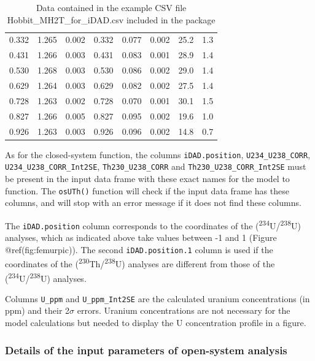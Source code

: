\documentclass[]{elsarticle} %
\begin{document}
\begin{table}[ht]
\begin{tabular}{cccccccc}
  0.332 & 1.265 & 0.002 & 0.332 & 0.077 & 0.002 & 25.2 & 1.3 \\ 
  0.431 & 1.266 & 0.003 & 0.431 & 0.083 & 0.001 & 28.9 & 1.4 \\ 
  0.530 & 1.268 & 0.003 & 0.530 & 0.086 & 0.002 & 29.0 & 1.4 \\ 
  0.629 & 1.264 & 0.003 & 0.629 & 0.082 & 0.002 & 27.5 & 1.4 \\ 
  0.728 & 1.263 & 0.002 & 0.728 & 0.070 & 0.001 & 30.1 & 1.5 \\ 
  0.827 & 1.266 & 0.005 & 0.827 & 0.095 & 0.002 & 19.6 & 1.0 \\ 
  0.926 & 1.263 & 0.003 & 0.926 & 0.096 & 0.002 & 14.8 & 0.7 \\ 
   \hline
\end{tabular}
\caption{\label{tab:hobbitone}Data contained in the example CSV file Hobbit\_MH2T\_for\_iDAD.csv included in the package} 
\end{table}

As for the closed-system function, the columns \texttt{iDAD.position}, \texttt{U234\_U238\_CORR}, \texttt{U234\_U238\_CORR\_Int2SE}, \texttt{Th230\_U238\_CORR} and \texttt{Th230\_U238\_CORR\_Int2SE} must be present in the input data frame with these exact names for the model to function. The \texttt{osUTh()} function will check if the input data frame has these columns, and will stop with an error message if it does not find these columns.

The \texttt{iDAD.position} column corresponds to the coordinates of the (\textsuperscript{234}U/\textsuperscript{238}U) analyses, which as indicated above take values between -1 and 1 (Figure @ref(fig:femurpic)). The second \texttt{iDAD.position.1} column is used if the coordinates of the (\textsuperscript{230}Th/\textsuperscript{238}U) analyses are different from those of the (\textsuperscript{234}U/\textsuperscript{238}U) analyses.

Columns \texttt{U\_ppm} and \texttt{U\_ppm\_Int2SE} are the calculated uranium concentrations (in ppm) and their 2\(\sigma\) errors. Uranium concentrations are not necessary for the model calculations but needed to display the U concentration profile in a figure.

\hypertarget{details-of-the-input-parameters-of-open-system-analysis}{%
\subsubsection{Details of the input parameters of open-system analysis}\label{details-of-the-input-parameters-of-open-system-analysis}}
\end{document}
